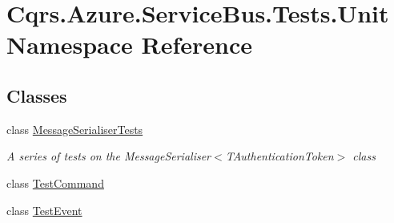 \hypertarget{namespaceCqrs_1_1Azure_1_1ServiceBus_1_1Tests_1_1Unit}{}\section{Cqrs.\+Azure.\+Service\+Bus.\+Tests.\+Unit Namespace Reference}
\label{namespaceCqrs_1_1Azure_1_1ServiceBus_1_1Tests_1_1Unit}
\subsection*{Classes}
\begin{DoxyCompactItemize}
\item 
class \hyperlink{classCqrs_1_1Azure_1_1ServiceBus_1_1Tests_1_1Unit_1_1MessageSerialiserTests}{Message\+Serialiser\+Tests}
\begin{DoxyCompactList}\small\item\em A series of tests on the Message\+Serialiser$<$\+T\+Authentication\+Token$>$ class \end{DoxyCompactList}\item 
class \hyperlink{classCqrs_1_1Azure_1_1ServiceBus_1_1Tests_1_1Unit_1_1TestCommand}{Test\+Command}
\item 
class \hyperlink{classCqrs_1_1Azure_1_1ServiceBus_1_1Tests_1_1Unit_1_1TestEvent}{Test\+Event}
\end{DoxyCompactItemize}
